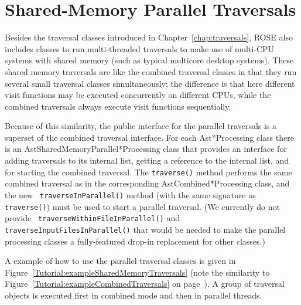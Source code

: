 
\chapter{Shared-Memory Parallel Traversals}
\label{chap:sharedMemoryTraversals}

    Besides the traversal classes introduced in Chapter~\ref{chap:traversals},
ROSE also includes classes to run multi-threaded traversals to make use of
multi-CPU systems with shared memory (such as typical multicore desktop
systems). These shared memory traversals are like the combined traversal
classes in that they run several small traversal classes simultaneously; the
difference is that here different visit functions may be executed concurrently
on different CPUs, while the combined traversals always execute visit
functions sequentially.

    Because of this similarity, the public interface for the parallel
traversals is a superset of the combined traversal interface. For each
Ast*Processing class there is an AstSharedMemoryParallel*Processing class that
provides an interface for adding traversals to its internal list, getting a
reference to the internal list, and for starting the combined traversal. The
{\tt traverse()} method performs the same combined traversal as in the
corresponding AstCombined*Processing class, and the new {\tt
traverseInParallel()} method (with the same signature as {\tt traverse()})
must be used to start a parallel traversal. (We currently do not provide {\tt
traverseWithinFileInParallel()} and {\tt traverseInputFilesInParallel()} that
would be needed to make the parallel processing classes a fully-featured
drop-in replacement for other classes.)

    A example of how to use the parallel traversal classes is given in
Figure~\ref{Tutorial:exampleSharedMemoryTraversals} (note the similarity to
Figure~\ref{Tutorial:exampleCombinedTraversals} on
page~\pageref{Tutorial:exampleCombinedTraversals}). A group of traversal
objects is executed first in combined mode and then in parallel threads.

